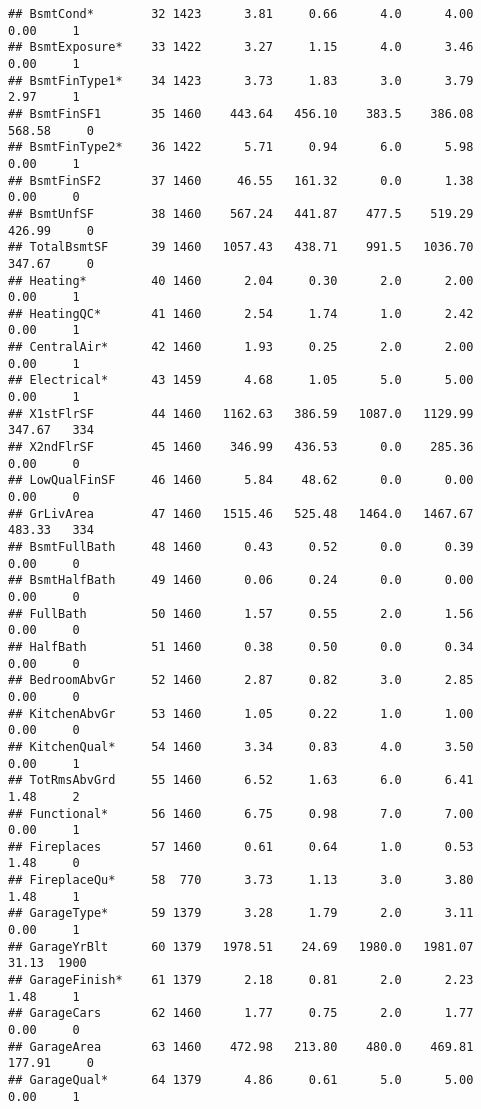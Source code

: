 \documentclass[
]{article}
\begin{document}
\begin{verbatim}
## BsmtCond*        32 1423      3.81     0.66      4.0      4.00     0.00     1
## BsmtExposure*    33 1422      3.27     1.15      4.0      3.46     0.00     1
## BsmtFinType1*    34 1423      3.73     1.83      3.0      3.79     2.97     1
## BsmtFinSF1       35 1460    443.64   456.10    383.5    386.08   568.58     0
## BsmtFinType2*    36 1422      5.71     0.94      6.0      5.98     0.00     1
## BsmtFinSF2       37 1460     46.55   161.32      0.0      1.38     0.00     0
## BsmtUnfSF        38 1460    567.24   441.87    477.5    519.29   426.99     0
## TotalBsmtSF      39 1460   1057.43   438.71    991.5   1036.70   347.67     0
## Heating*         40 1460      2.04     0.30      2.0      2.00     0.00     1
## HeatingQC*       41 1460      2.54     1.74      1.0      2.42     0.00     1
## CentralAir*      42 1460      1.93     0.25      2.0      2.00     0.00     1
## Electrical*      43 1459      4.68     1.05      5.0      5.00     0.00     1
## X1stFlrSF        44 1460   1162.63   386.59   1087.0   1129.99   347.67   334
## X2ndFlrSF        45 1460    346.99   436.53      0.0    285.36     0.00     0
## LowQualFinSF     46 1460      5.84    48.62      0.0      0.00     0.00     0
## GrLivArea        47 1460   1515.46   525.48   1464.0   1467.67   483.33   334
## BsmtFullBath     48 1460      0.43     0.52      0.0      0.39     0.00     0
## BsmtHalfBath     49 1460      0.06     0.24      0.0      0.00     0.00     0
## FullBath         50 1460      1.57     0.55      2.0      1.56     0.00     0
## HalfBath         51 1460      0.38     0.50      0.0      0.34     0.00     0
## BedroomAbvGr     52 1460      2.87     0.82      3.0      2.85     0.00     0
## KitchenAbvGr     53 1460      1.05     0.22      1.0      1.00     0.00     0
## KitchenQual*     54 1460      3.34     0.83      4.0      3.50     0.00     1
## TotRmsAbvGrd     55 1460      6.52     1.63      6.0      6.41     1.48     2
## Functional*      56 1460      6.75     0.98      7.0      7.00     0.00     1
## Fireplaces       57 1460      0.61     0.64      1.0      0.53     1.48     0
## FireplaceQu*     58  770      3.73     1.13      3.0      3.80     1.48     1
## GarageType*      59 1379      3.28     1.79      2.0      3.11     0.00     1
## GarageYrBlt      60 1379   1978.51    24.69   1980.0   1981.07    31.13  1900
## GarageFinish*    61 1379      2.18     0.81      2.0      2.23     1.48     1
## GarageCars       62 1460      1.77     0.75      2.0      1.77     0.00     0
## GarageArea       63 1460    472.98   213.80    480.0    469.81   177.91     0
## GarageQual*      64 1379      4.86     0.61      5.0      5.00     0.00     1

\end{verbatim}
\end{document}
